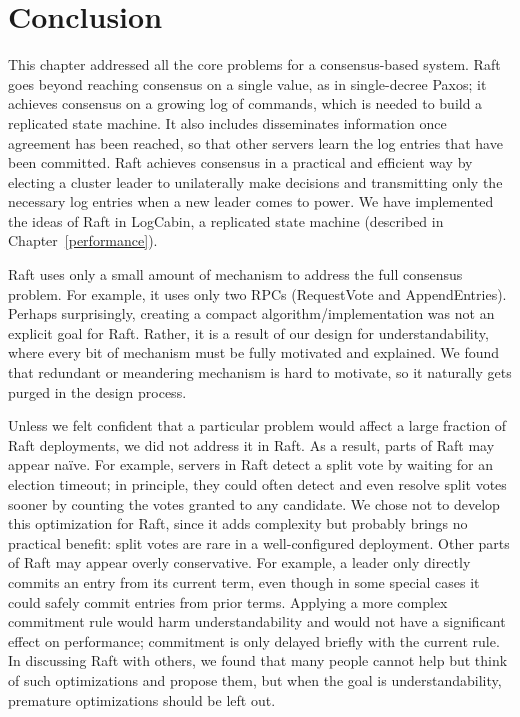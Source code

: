 \section{Conclusion}
\label{basicraft:conclusion}

This chapter addressed all the core problems for a consensus-based
system. Raft goes beyond reaching consensus on a single value, as in
single-decree Paxos; it achieves consensus on a growing log of commands,
which is needed to build a replicated state machine. It also
includes disseminates information once agreement has been reached, so
that other servers learn the log entries that have been committed. Raft
achieves consensus in a practical and efficient way by electing a
cluster leader to unilaterally make decisions and transmitting only the
necessary log entries when a new leader comes to power. We have
implemented the ideas of Raft in LogCabin, a replicated state machine
(described in Chapter~\ref{performance}).

Raft uses only a small amount of mechanism to address the full consensus
problem. For example, it uses only two RPCs (RequestVote and
AppendEntries). Perhaps surprisingly, creating a compact
algorithm/implementation was not an explicit goal for Raft. Rather, it
is a result of our design for understandability, where every bit of
mechanism must be fully motivated and explained. We found that redundant
or meandering mechanism is hard to motivate, so it naturally gets purged
in the design process.

Unless we felt confident that a particular problem would affect a large
fraction of Raft deployments, we did not address it in Raft. As a
result, parts of Raft may appear na\"ive. For example, servers in Raft
detect a split vote by waiting for an election timeout; in principle,
they could often detect and even resolve split votes sooner by counting
the votes granted to any candidate. We chose not to develop this
optimization for Raft, since it adds complexity but probably brings no
practical benefit: split votes are rare in a well-configured deployment.
Other parts of Raft may appear overly conservative. For example, a
leader only directly commits an entry from its current term, even though
in some special cases it could safely commit entries from prior terms.
Applying a more complex commitment rule would harm understandability and
would not have a significant effect on performance; commitment is only
delayed briefly with the current rule. In discussing Raft with others,
we found that many people cannot help but think of such optimizations
and propose them, but when the goal is understandability, premature
optimizations should be left out.

